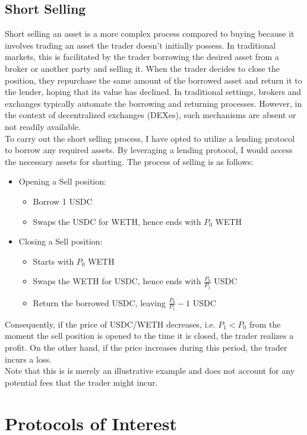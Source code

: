 \subsection{Short Selling}
Short selling an asset is a more complex process compared to buying because it involves trading an asset the trader doesn't initially possess. In traditional markets, this is facilitated by the trader borrowing the desired asset from a broker or another party and selling it. When the trader decides to close the position, they repurchase the same amount of the borrowed asset and return it to the lender, hoping that its value has declined. In traditional settings, brokers and exchanges typically automate the borrowing and returning processes. However, in the context of decentralized exchanges (DEXes), such mechanisms are absent or not readily available.
\\[3mm]
To carry out the short selling process, I have opted to utilize a lending protocol to borrow any required assets. By leveraging a lending protocol, I would access the necessary assets for shorting. The process of selling is as follows:
\begin{itemize}
    \item Opening a Sell position:\begin{itemize}
        \item Borrow 1 USDC
        \item Swaps the USDC for WETH, hence ends with $P_0$ WETH
    \end{itemize}
    \item Closing a Sell position:\begin{itemize}
        \item Starts with $P_0$ WETH
        \item Swaps the WETH for USDC, hence ends with $\frac{P_0}{P_1}$ USDC
        \item Return the borrowed USDC, leaving $\frac{P_0}{P_1} - 1$ USDC
    \end{itemize}
\end{itemize}
Consequently, if the price of USDC/WETH decreases, i.e. $P_1 < P_0$ from the moment the sell position is opened to the time it is closed, the trader realizes a profit. On the other hand, if the price increases during this period, the trader incurs a loss.
\\[3mm]
Note that this is is merely an illustrative example and does not account for any potential fees that the trader might incur.


\section{Protocols of Interest}
